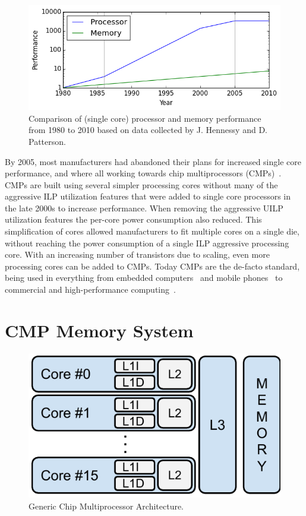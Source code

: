 \begin{figure}[ht]
\centering
\includegraphics[width=.8\textwidth]{figures/introduction/memory-gap}
\caption{Comparison of (single core) processor and memory performance from 1980 to 2010 based on data collected by J. Hennessy and D. Patterson\cite{hennessy2012}.}
\label{fig:introduction:memgap}
\end{figure}

By 2005, most manufacturers had abandoned their plans for increased single core performance, and where all working towards chip multiprocessors (CMPs)~\cite{Sutter2005}.
CMPs are built using several simpler processing cores without many of the aggressive ILP utilization features that were added to single core processors in the late 2000s to increase performance.
When removing the aggressive UILP utilization features the per-core power consumption also reduced.
This simplification of cores allowed manufacturers to fit multiple cores on a single die, without reaching the power consumption of a single ILP aggressive processing core.
With an increasing number of transistors due to scaling, even more processing cores can be added to CMPs.
Today CMPs are the de-facto standard, being used in everything from embedded computers~\cite{ARM2010} and mobile phones~\cite{Ho2014} to commercial and high-performance computing~\cite{Thomadakis2011, Jain2013}.


\section{CMP Memory System}

\begin{figure}[ht]
\centering
\includegraphics[scale=.65]{figures/processor_model/processor_model}
\caption{Generic Chip Multiprocessor Architecture.}
\label{fig:cmp_model}
\end{figure}

